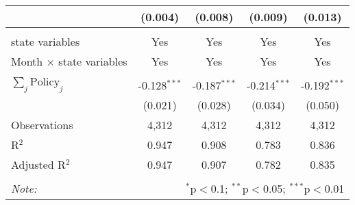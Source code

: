 \begin{tabular}{@{\extracolsep{1pt}}lcccc}
  & (0.004) & (0.008) & (0.009) & (0.013) \\ 
 \hline \\[-1.8ex] 
state variables & Yes & Yes & Yes & Yes \\ 
Month $\times$ state variables & Yes & Yes & Yes & Yes \\ 
\hline \\[-1.8ex] 
$\sum_j \mathrm{Policy}_j$ & -0.128$^{***}$ & -0.187$^{***}$ & -0.214$^{***}$ & -0.192$^{***}$ \\ 
 & (0.021) & (0.028) & (0.034) & (0.050) \\ 
Observations & 4,312 & 4,312 & 4,312 & 4,312 \\ 
R$^{2}$ & 0.947 & 0.908 & 0.783 & 0.836 \\ 
Adjusted R$^{2}$ & 0.947 & 0.907 & 0.782 & 0.835 \\ 
\hline 
\hline \\[-1.8ex] 
\textit{Note:}  & \multicolumn{4}{r}{$^{*}$p$<$0.1; $^{**}$p$<$0.05; $^{***}$p$<$0.01} \\ 
\end{tabular} 